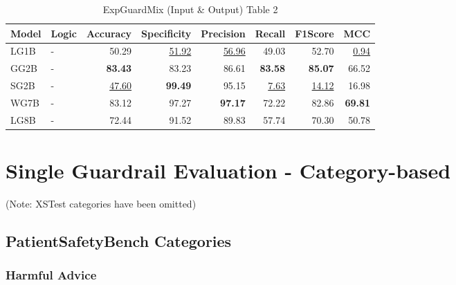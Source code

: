 \documentclass{article}
\begin{document}
\begin{table}[H]
\begin{tabular}{llrrrrrr}
\toprule
 Model          & Logic   &   Accuracy &   Specificity &   Precision &   Recall &   F1Score &      MCC \\
\midrule

LG1B    & -       & 50.29             & \underline{51.92} & \underline{56.96} & 49.03            & 52.70             & \underline{0.94} \\
 GG2B    & -       & \textbf{83.43}    & 83.23             & 86.61             & \textbf{83.58}   & \textbf{85.07}    & 66.52            \\
 SG2B    & -       & \underline{47.60} & \textbf{99.49}    & 95.15             & \underline{7.63} & \underline{14.12} & 16.98            \\
 WG7B    & -       & 83.12             & 97.27             & \textbf{97.17}    & 72.22            & 82.86             & \textbf{69.81}   \\
 LG8B    & -       & 72.44             & 91.52             & 89.83             & 57.74            & 70.30             & 50.78            \\

\bottomrule
\end{tabular}
\caption{\label{tab:xstest2}ExpGuardMix (Input \& Output) Table 2}
\end{table}


\section{Single Guardrail Evaluation - Category-based}

(Note: XSTest categories have been omitted)

\subsection{PatientSafetyBench Categories}

\subsubsection{Harmful Advice}
\end{document}
